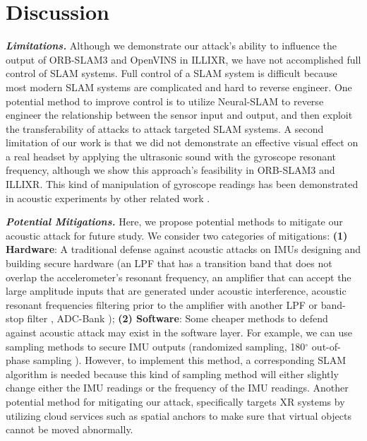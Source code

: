 \section{Discussion}
\label{sec:discussion}

\noindent \emph{\textbf{Limitations.}} Although we demonstrate our attack's ability to influence the output of ORB-SLAM3 and OpenVINS in ILLIXR, we have not accomplished full control of SLAM systems.
Full control of a SLAM system is difficult because most modern SLAM systems are complicated and hard to reverse engineer. One potential method to improve control is to utilize Neural-SLAM \cite{chaplot2020learning,zhang2017neural,liso2024loopy} to reverse engineer the relationship between the sensor input and output, and then exploit the transferability of attacks to attack targeted SLAM systems. A second limitation of our work is that we did not demonstrate an effective visual effect on a real headset by applying the ultrasonic sound with the gyroscope resonant frequency, although we show this approach's feasibility in ORB-SLAM3 and ILLIXR. This kind of manipulation of gyroscope readings has been demonstrated in acoustic experiments by other related work \cite{trippel2017walnut,son2015rocking,wang2017sonic}. 

\noindent \emph{\textbf{Potential Mitigations.}} Here, we propose potential methods to mitigate our acoustic attack for future study. We consider two categories of mitigations: \textbf{(1) Hardware}: A traditional defense against acoustic attacks on IMUs designing and building secure hardware (\eg an LPF that has a transition band that does not overlap the accelerometer’s resonant frequency, an amplifier that can accept the large amplitude inputs that are generated under acoustic interference, acoustic resonant frequencies filtering prior to the amplifier with another LPF or band-stop filter \cite{trippel2017walnut}, ADC-Bank \cite{zhang2023adc}); \textbf{(2) Software}: Some cheaper methods to defend against acoustic attack may exist in the software layer. For example, we can use sampling methods to secure IMU outputs (\eg randomized sampling, 180$^{\circ}$ out-of-phase sampling \cite{trippel2017walnut}). However, to implement this method, a corresponding SLAM algorithm is needed because this kind of sampling method will either slightly change either the IMU readings or the frequency of the IMU readings. Another potential method for mitigating our attack, specifically targets XR systems by utilizing cloud services such as spatial anchors \cite{microsoftSpatialAnchors} to make sure that virtual objects cannot be moved abnormally. 

